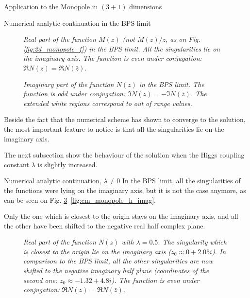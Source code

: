 \begin{section}{Application to the Monopole in $(3+1)$ dimensions}
\begin{subsection}{Numerical analytic continuation in the BPS limit}
    \begin{figure}[!ht]
      \begin{center}
        
        \caption{\em Real part of the function $M(z)$ (not $M(z)/z$,
          as on Fig. \ref{fig:2d_monopole_f}) in the BPS
          limit. All the singularities lie on the imaginary axis. The
          function is even under conjugation: $\Re N(z) = \Re N(\bar
          z)$.}
        \label{fig:cm_monopole_h_real_bps}
      \end{center}
    \end{figure}

    \begin{figure}[!ht]
      \begin{center}
        
        \caption{\em Imaginary part of the function $N(z)$ in the BPS
          limit. The function is odd under conjugation: $\Im N(z) =
          -\Im N(\bar z)$. The extended white regions correspond to
          out of range values.}
        \label{fig:cm_monopole_h_imag_bps}
      \end{center}
    \end{figure}
    Beside the fact that the numerical scheme has shown to converge
    to the solution, the most important feature to notice is that
    all the singularities lie on the imaginary axis.

    The next subsection show the behaviour of the solution when the
    Higgs coupling constant $\lambda$ is slightly increased.
  \end{subsection}
  \begin{subsection}{Numerical analytic continuation, $\lambda \neq 0$}
    In the BPS limit, all the singularities of the functions were lying on
    the imaginary axis, but it is not the case anymore, as can be seen
    on Fig. \ref{fig:cm_monopole_f_real}--\ref{fig:cm_monopole_h_imag}.

    Only the one which is closest to the origin stays on the imaginary
    axis, and all the other have been shifted to the negative real
    half complex plane.
    \begin{figure}[!ht]
      \begin{center}
        
        \caption{\em Real part of the function $N(z)$ with $\lambda =
          0.5$. The singularity which is closest to the origin lie on
          the imaginary axis ($z_0\approx 0+2.05i$). In comparison to
          the BPS limit, all the other singularities are now shifted
          to the negative imaginary half plane (coordinates of the
          second one: $z_0\approx -1.32+4.8i$). The function is even
          under conjugation: $\Re N(z) = \Re N(\bar z)$.}
        \label{fig:cm_monopole_f_real}
      \end{center}
    \end{figure}


\end{subsection}
\end{section}
